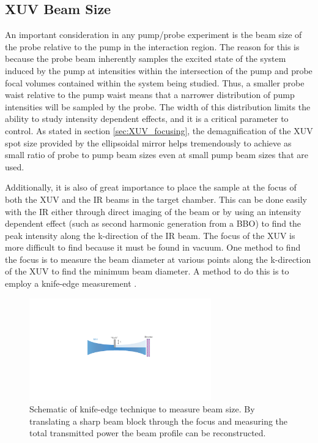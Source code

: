 \subsection{XUV Beam Size}
\label{sec:xuv_beam_size_knife_edge}

An important consideration in any pump/probe experiment is the beam size of the probe relative to the pump in the interaction region.  The reason for this is because the probe beam inherently samples the excited state of the system induced by the pump at intensities within the intersection of the pump and probe focal volumes contained within the system being studied.  Thus, a smaller probe waist relative to the pump waist means that a narrower distribution of pump intensities will be sampled by the probe.  The width of this distribution limits the ability to study intensity dependent effects, and it is a critical parameter to control. As stated in section \ref{sec:XUV_focusing}, the demagnification of the XUV spot size provided by the ellipsoidal mirror helps tremendously to achieve as small ratio of probe to pump beam sizes even at small pump beam sizes that are used.

Additionally, it is also of great importance to place the sample at the focus of both the XUV and the IR beams in the target chamber.  This can be done easily with the IR either through direct imaging of the beam or by using an intensity dependent effect (such as second harmonic generation from a BBO) to find the peak intensity along the k-direction of the IR beam.  The focus of the XUV is more difficult to find because it must be found in vacuum.  One method to find the focus is to measure the beam diameter at various points along the k-direction of the XUV to find the minimum beam diameter.  A method to do this is to employ a knife-edge measurement \cite{arnaudTechniqueFastMeasurement1971, skinnerMeasurementRadiusHighpower1972,marshallTwoMethodsMeasuring2010,almeidaHarmonicsBeamsCharacterization2016}.

\begin{figure}
	\centering
	\includegraphics[width=0.7\textwidth]{figures/Beamline/knife_edge_xuv.pdf}
	\caption[Schematic of knife-edge technique to measure beam size]{Schematic of knife-edge technique to measure beam size. By translating a sharp beam block through the focus and measuring the total transmitted power the beam profile can be reconstructed.}
	\label{fig:knife_edge_beam_size_measurement}
\end{figure}

